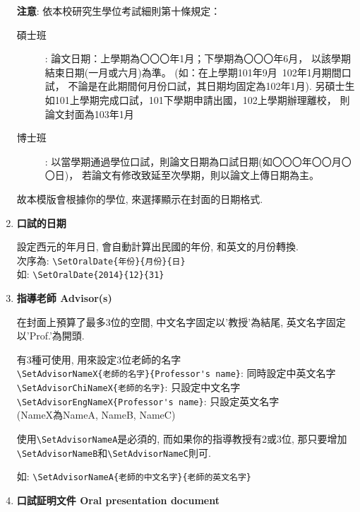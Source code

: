 \begin{enumerate}
{    \textbf{注意}: 依本校研究生學位考試細則第十條規定：
      \begin{description}
        \item[碩士班]: \hfill
          論文日期：上學期為〇〇〇年1月；下學期為〇〇〇年6月，
          以該學期結束日期(一月或六月)為準。
          (如：在上學期101年9月~102年1月期間口試，
              不論是在此期間何月份口試，其日期均固定為102年1月).
          另碩士生如101上學期完成口試，101下學期申請出國，102上學期辦理離校，
          則論文封面為103年1月

        \item[博士班]: \hfill
        以當學期通過學位口試，則論文日期為口試日期(如〇〇〇年〇〇月〇〇日)，
        若論文有修改致延至次學期，則以論文上傳日期為主。
      \end{description}
    故本模版會根據你的學位, 來選擇顯示在封面的日期格式.
  } %

  \item
  {
    \textbf{口試的日期}

    設定西元的年月日, 會自動計算出民國的年份, 和英文的月份轉換.\\
    次序為: \verb|\SetOralDate{年份}{月份}{日}|\\
    如: \verb|\SetOralDate{2014}{12}{31}|
  } %

  \item
  {
    \textbf{指導老師 Advisor(s)}

    在封面上預算了最多3位的空間, 中文名字固定以'教授'為結尾, 英文名字固定以'Prof.'為開頭.

    有3種可使用, 用來設定3位老師的名字\\
    \verb|\SetAdvisorNameX{老師的名字}{Professor's name}|: 同時設定中英文名字\\
    \verb|\SetAdvisorChiNameX{老師的名字}|: 只設定中文名字\\
    \verb|\SetAdvisorEngNameX{Professor's name}|: 只設定英文名字\\
    (NameX為NameA, NameB, NameC)

    使用\verb|\SetAdvisorNameA|是必須的, 而如果你的指導教授有2或3位, 那只要增加\verb|\SetAdvisorNameB|和\verb|\SetAdvisorNameC|則可.

    如: \verb|\SetAdvisorNameA{老師的中文名字}{老師的英文名字}|
  } %

  \item
  {
    \textbf{口試証明文件 Oral presentation document}

}
\end{enumerate}
